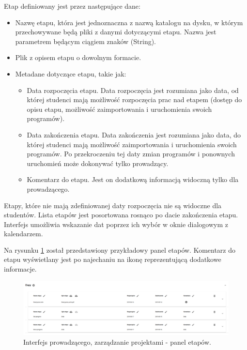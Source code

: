 Etap definiowany jest przez następujące dane:
\begin {itemize}
    \item Nazwę etapu, która jest jednoznaczna z nazwą katalogu na dysku, w którym przechowywane będą pliki z danymi dotyczącymi etapu.
    Nazwa jest parametrem będącym ciągiem znaków (String).
    \item Plik z opisem etapu o dowolnym formacie.
    \item Metadane dotyczące etapu, takie jak:
    \begin {itemize}
        \item Data rozpoczęcia etapu.
        Data rozpoczęcia jest rozumiana jako data, od której studenci mają możliwość rozpoczęcia prac nad etapem (dostęp do opisu etapu, możliwość zaimportowania i uruchomienia swoich programów).
        \item Data zakończenia etapu.
        Data zakończenia jest rozumiana jako data, do której studenci mają możliwość zaimportowania i uruchomienia swoich programów.
        Po przekroczeniu tej daty zmian programów i ponownych uruchomień może dokonywać tylko prowadzący.
        \item Komentarz do etapu.
        Jest on dodatkową informacją widoczną tylko dla prowadzącego.
    \end{itemize}
\end {itemize}

Etapy, które nie mają zdefiniowanej daty rozpoczęcia nie są widoczne dla studentów.
Lista etapów jest posortowana rosnąco po dacie zakończenia etapu.
Interfejs umożliwia wskazanie dat poprzez ich wybór w oknie dialogowym z kalendarzem.

Na rysunku \ref{fig:lecturer_stages} został przedstawiony przykładowy panel etapów.
Komentarz do etapu wyświetlany jest po najechaniu na ikonę reprezentującą dodatkowe informacje.

\begin{figure}[h]
    \centering
    \includegraphics[width = 15cm]{chapter04/lecturer_stages.png}
    \caption{Interfejs prowadzącego, zarządzanie projektami - panel etapów.}
    \label{fig:lecturer_stages}
\end{figure}

